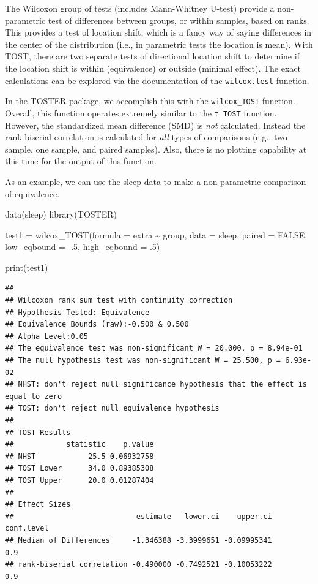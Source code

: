 \documentclass[]{interact}
\theoremstyle{plain}%
\theoremstyle{definition}
\theoremstyle{remark}
\newenvironment{Shaded}{\begin{snugshade}}{\end{snugshade}}
\newcommand{\AttributeTok}[1]{\textcolor[rgb]{0.77,0.63,0.00}{#1}}
\newcommand{\ConstantTok}[1]{\textcolor[rgb]{0.00,0.00,0.00}{#1}}
\newcommand{\DecValTok}[1]{\textcolor[rgb]{0.00,0.00,0.81}{#1}}
\newcommand{\FunctionTok}[1]{\textcolor[rgb]{0.00,0.00,0.00}{#1}}
\newcommand{\NormalTok}[1]{#1}
\newcommand{\OtherTok}[1]{\textcolor[rgb]{0.56,0.35,0.01}{#1}}
\newcommand{\SpecialCharTok}[1]{\textcolor[rgb]{0.00,0.00,0.00}{#1}}
\newcommand{\StringTok}[1]{\textcolor[rgb]{0.31,0.60,0.02}{#1}}
\begin{document}
The Wilcoxon group of tests (includes Mann-Whitney U-test) provide a
non-parametric test of differences between groups, or within samples,
based on ranks. This provides a test of location shift, which is a fancy
way of saying differences in the center of the distribution (i.e., in
parametric tests the location is mean). With TOST, there are two
separate tests of directional location shift to determine if the
location shift is within (equivalence) or outside (minimal effect). The
exact calculations can be explored via the documentation of the
\texttt{wilcox.test} function.

In the TOSTER package, we accomplish this with the \texttt{wilcox\_TOST}
function. Overall, this function operates extremely similar to the
\texttt{t\_TOST} function. However, the standardized mean difference
(SMD) is \emph{not} calculated. Instead the rank-biserial correlation is
calculated for \emph{all} types of comparisons (e.g., two sample, one
sample, and paired samples). Also, there is no plotting capability at
this time for the output of this function.

As an example, we can use the sleep data to make a non-parametric
comparison of equivalence.

\begin{Shaded}
\begin{Highlighting}[]
\FunctionTok{data}\NormalTok{(}\StringTok{\textquotesingle{}sleep\textquotesingle{}}\NormalTok{)}
\FunctionTok{library}\NormalTok{(TOSTER)}

\NormalTok{test1 }\OtherTok{=} \FunctionTok{wilcox\_TOST}\NormalTok{(}\AttributeTok{formula =}\NormalTok{ extra }\SpecialCharTok{\textasciitilde{}}\NormalTok{ group,}
                      \AttributeTok{data =}\NormalTok{ sleep,}
                      \AttributeTok{paired =} \ConstantTok{FALSE}\NormalTok{,}
                      \AttributeTok{low\_eqbound =} \SpecialCharTok{{-}}\NormalTok{.}\DecValTok{5}\NormalTok{,}
                      \AttributeTok{high\_eqbound =}\NormalTok{ .}\DecValTok{5}\NormalTok{)}


\FunctionTok{print}\NormalTok{(test1)}
\end{Highlighting}
\end{Shaded}

\begin{verbatim}
## 
## Wilcoxon rank sum test with continuity correction
## Hypothesis Tested: Equivalence
## Equivalence Bounds (raw):-0.500 & 0.500
## Alpha Level:0.05
## The equivalence test was non-significant W = 20.000, p = 8.94e-01
## The null hypothesis test was non-significant W = 25.500, p = 6.93e-02
## NHST: don't reject null significance hypothesis that the effect is equal to zero 
## TOST: don't reject null equivalence hypothesis
## 
## TOST Results 
##            statistic    p.value
## NHST            25.5 0.06932758
## TOST Lower      34.0 0.89385308
## TOST Upper      20.0 0.01287404
## 
## Effect Sizes 
##                            estimate   lower.ci    upper.ci conf.level
## Median of Differences     -1.346388 -3.3999651 -0.09995341        0.9
## rank-biserial correlation -0.490000 -0.7492521 -0.10053222        0.9
\end{verbatim}
\end{document}
